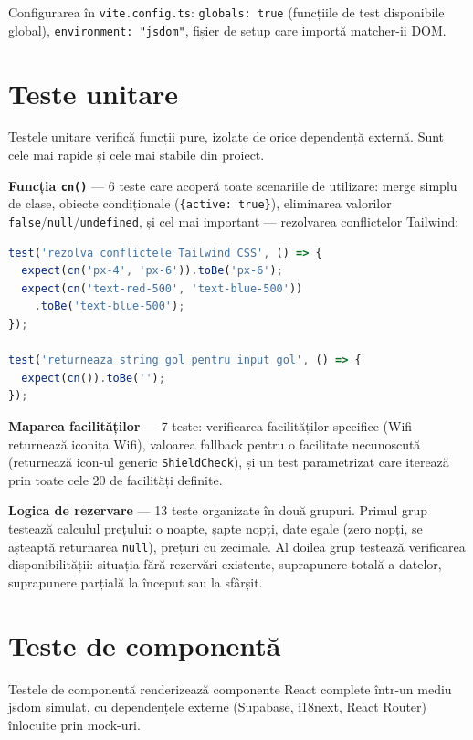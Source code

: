 \documentclass[12pt,a4paper,oneside]{report}
\begin{document}
Configurarea în \texttt{vite.config.ts}: \texttt{globals: true} (funcțiile de test disponibile global), \texttt{environment: "jsdom"}, fișier de setup care importă matcher-ii DOM.


\section{Teste unitare}

Testele unitare verifică funcții pure, izolate de orice dependență externă. Sunt cele mai rapide și cele mai stabile din proiect.

\textbf{Funcția \texttt{cn()}} — 6 teste care acoperă toate scenariile de utilizare: merge simplu de clase, obiecte condiționale (\texttt{\{active: true\}}), eliminarea valorilor \texttt{false}/\texttt{null}/\texttt{undefined}, și cel mai important — rezolvarea conflictelor Tailwind:

\begin{lstlisting}[language=TypeScript, caption={Teste pentru funcția cn() — rezolvare conflicte}]
test('rezolva conflictele Tailwind CSS', () => {
  expect(cn('px-4', 'px-6')).toBe('px-6');
  expect(cn('text-red-500', 'text-blue-500'))
    .toBe('text-blue-500');
});

test('returneaza string gol pentru input gol', () => {
  expect(cn()).toBe('');
});
\end{lstlisting}

\textbf{Maparea facilităților} — 7 teste: verificarea facilităților specifice (Wifi returnează iconița Wifi), valoarea fallback pentru o facilitate necunoscută (returnează icon-ul generic \texttt{ShieldCheck}), și un test parametrizat care iterează prin toate cele 20 de facilități definite.

\textbf{Logica de rezervare} — 13 teste organizate în două grupuri. Primul grup testează calculul prețului: o noapte, șapte nopți, date egale (zero nopți, se așteaptă returnarea \texttt{null}), prețuri cu zecimale. Al doilea grup testează verificarea disponibilității: situația fără rezervări existente, suprapunere totală a datelor, suprapunere parțială la început sau la sfârșit.


\section{Teste de componentă}

Testele de componentă renderizează componente React complete într-un mediu jsdom simulat, cu dependențele externe (Supabase, i18next, React Router) înlocuite prin mock-uri.
\end{document}
